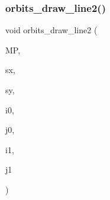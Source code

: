 \mbox{\label{draw_8_c_ac3530544761e3a79ddef41ed599ea345}} 
\subsubsection{\texorpdfstring{orbits\+\_\+draw\+\_\+line2()}{orbits\_draw\_line2()}}
{\footnotesize\ttfamily void orbits\+\_\+draw\+\_\+line2 (\begin{DoxyParamCaption}\item[{\mbox{\hyperlink{classmp__graphics}{mp\+\_\+graphics}} \&}]{MP,  }\item[{\mbox{\hyperlink{galois_8h_a09fddde158a3a20bd2dcadb609de11dc}{I\+NT}}}]{sx,  }\item[{\mbox{\hyperlink{galois_8h_a09fddde158a3a20bd2dcadb609de11dc}{I\+NT}}}]{sy,  }\item[{\mbox{\hyperlink{galois_8h_a09fddde158a3a20bd2dcadb609de11dc}{I\+NT}}}]{i0,  }\item[{\mbox{\hyperlink{galois_8h_a09fddde158a3a20bd2dcadb609de11dc}{I\+NT}}}]{j0,  }\item[{\mbox{\hyperlink{galois_8h_a09fddde158a3a20bd2dcadb609de11dc}{I\+NT}}}]{i1,  }\item[{\mbox{\hyperlink{galois_8h_a09fddde158a3a20bd2dcadb609de11dc}{I\+NT}}}]{j1 }\end{DoxyParamCaption})}

\mbox{\label{draw_8_c_af0899d0353c41dee492de1e8925965f4}} 
